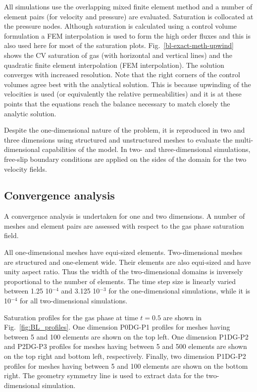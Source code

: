 \documentclass[preprint,authoryear,12pt]{elsarticle}
\begin{document}
{All simulations use the overlapping mixed finite element method and a
number of element pairs (for velocity and pressure) are
evaluated. Saturation is collocated at the pressure nodes. Although
saturation is calculated using a control volume formulation a FEM
interpolation is used to form the high order fluxes and this is also
used here for most of the saturation plots.
Fig.~\ref{bl-exact-meth-upwind} shows the CV saturation of gas (with
horizontal and vertical lines) and the quadratic finite element
interpolation (FEM interpolation). The solution converges with
increased resolution. Note that the right corners of the control
volumes agree best with the analytical solution. This is because
upwinding of the velocities is used (or equivalently the relative
permeabilities) and it is at these points that the equations reach the
balance necessary to match closely the analytic solution.

Despite the one-dimensional nature of the problem, it is reproduced in
two and three dimensions using structured and unstructured meshes to
evaluate the multi-dimensional capabilities of the model. In two- and
three-dimensional simulations, free-slip boundary conditions are
applied on the sides of the domain for the two velocity fields.

\subsection{Convergence analysis}
A convergence analysis is undertaken for one and two dimensions. A
number of meshes and element pairs are assessed with respect to the
gas phase saturation field.

All one-dimensional meshes have equi-sized elements. Two-dimensional
meshes are structured and one-element wide. Their elements are also
equi-sized and have unity aspect ratio. Thus the width of the
two-dimensional domains is inversely proportional to the number of
elements. The time step size is linearly varied between 1.25 10$^{-4}$
and 3.125 10$^{-3}$ for the one-dimensional simulations, while it is
10$^{-4}$ for all two-dimensional simulations.

Saturation profiles for the gas phase at time $t=0.5$ are shown in
Fig.~\ref{fig:BL_profiles}. One dimension P0DG-P1 profiles for meshes
having between 5 and 100 elements are shown on the top left. One
dimension P1DG-P2 and P2DG-P3 profiles for meshes having between 5 and
500 elements are shown on the top right and bottom left, respectively.
Finally, two dimension P1DG-P2 profiles for meshes having between 5
and 100 elements are shown on the bottom right. The geometry symmetry
line is used to extract data for the two-dimensional simulation.

}
\end{document}
